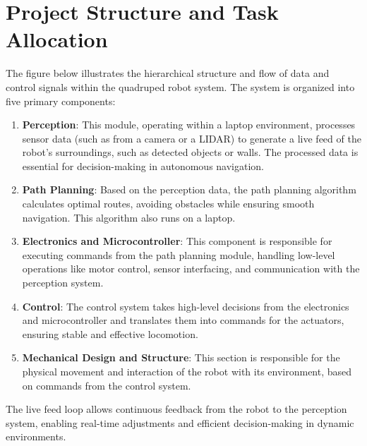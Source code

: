 \documentclass{article}
\begin{document}
\section{Project Structure and Task Allocation}

The figure below illustrates the hierarchical structure and flow of data and control signals within the quadruped robot system. The system is organized into five primary components:

\begin{enumerate}

    \item \textbf{Perception}: This module, operating within a laptop environment, processes sensor data (such as from a camera or a LIDAR) to generate a live feed of the robot’s surroundings, such as detected objects or walls. The processed data is essential for decision-making in autonomous navigation.
    
    \item \textbf{Path Planning}: Based on the perception data, the path planning algorithm calculates optimal routes, avoiding obstacles while ensuring smooth navigation. This algorithm also runs on a laptop.
    
    \item \textbf{Electronics and Microcontroller}: This component is responsible for executing commands from the path planning module, handling low-level operations like motor control, sensor interfacing, and communication with the perception system.
    
    \item \textbf{Control}: The control system takes high-level decisions from the electronics and microcontroller and translates them into commands for the actuators, ensuring stable and effective locomotion.
    
    \item \textbf{Mechanical Design and Structure}: This section is responsible for the physical movement and interaction of the robot with its environment, based on commands from the control system.
\end{enumerate}
    
The live feed loop allows continuous feedback from the robot to the perception system, enabling real-time adjustments and efficient decision-making in dynamic environments.
\end{document}
